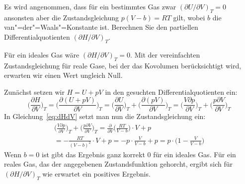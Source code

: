 \documentclass[DIV11]{scrartcl}
\begin{document}
\begin{question}[name=Differentialquotient]
Es wird angenommen, dass für ein bestimmtes Gas zwar $(\partial U/\partial
V)_T = 0 $ ansonsten aber die Zustandsgleichung $ p(V - b) = RT $ gilt, wobei
$b$ die van"=der"=Waals"=Konstante ist.  Berechnen Sie den partiellen
Differentialquotienten $(\partial H/\partial V)_T$.
\end{question}
\begin{solution}[name=Differentialquotient]
  Für ein ideales Gas wäre $(\partial H/\partial V)_T = 0$.  Mit der
  vereinfachten Zustandsgleichung für reale Gase, bei der das Kovolumen
  berücksichtigt wird, erwarten wir einen Wert ungleich Null.

  Zunächst setzen wir $H=U+pV$ in den gesuchten Differentialquotienten ein:
  \begin{equation}
    \biggl(\frac{\partial H}{\partial V}\biggr)_T
      = \biggl( \frac{\partial(U + pV)}{\partial V} \biggr)_T
      = \biggl(\frac{\partial U}{\partial V}\biggr)_T
        + \biggl(\frac{\partial(pV)}{\partial V}\biggr)_T
      = \biggl(\frac{V\partial p}{\partial V}\biggr)_T
        + \biggl(\frac{p\partial V}{\partial V}\biggr)_T \label{eq:dHdV}
  \end{equation}
  In Gleichung~\eqref{eq:dHdV} setzt man nun die Zustandsgleichung ein:
  \begin{multline}
    \biggl(\frac{V\partial p}{\partial V}\biggr)_T
      + \biggl(\frac{p\partial V}{\partial V}\biggr)_T
      = \frac{\partial}{\partial V} \biggl(\frac{RT}{V-b}\biggr) \cdot V  + p \\
      = -\frac{RT}{(V-b)^2} \cdot V + p
      = -p \cdot \frac{V}{V-b} + p
      = p \cdot \biggl(1-\frac{V}{V-b}\biggr)
  \end{multline}
  Wenn $b=0$ ist gibt das Ergebnis ganz korrekt $0$ für ein ideales Gas.  Für
  ein reales Gas, das der angegebenen Zustandsfunktion gehorcht, ergibt sich
  für $(\partial H/\partial V)_T$ wie erwartet ein positives Ergebnis.
\end{solution}
\end{document}
